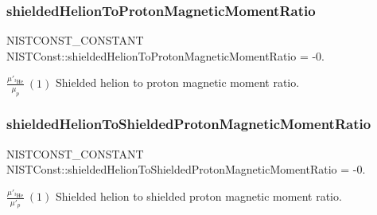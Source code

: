 \subsubsection{\texorpdfstring{shielded\+Helion\+To\+Proton\+Magnetic\+Moment\+Ratio}{shieldedHelionToProtonMagneticMomentRatio}}
{\footnotesize\ttfamily N\+I\+S\+T\+C\+O\+N\+S\+T\+\_\+\+C\+O\+N\+S\+T\+A\+NT N\+I\+S\+T\+Const\+::shielded\+Helion\+To\+Proton\+Magnetic\+Moment\+Ratio = -\/0.}

$\frac{\mu'_{^3\textrm{He}}}{\mu_p} \ (1)$ Shielded helion to proton magnetic moment ratio. \mbox{\label{group___n_i_s_t_const-_helion_gab3aafda5bad54b0ce79e85f2c142ebb2}} 
\subsubsection{\texorpdfstring{shielded\+Helion\+To\+Shielded\+Proton\+Magnetic\+Moment\+Ratio}{shieldedHelionToShieldedProtonMagneticMomentRatio}}
{\footnotesize\ttfamily N\+I\+S\+T\+C\+O\+N\+S\+T\+\_\+\+C\+O\+N\+S\+T\+A\+NT N\+I\+S\+T\+Const\+::shielded\+Helion\+To\+Shielded\+Proton\+Magnetic\+Moment\+Ratio = -\/0.}

$\frac{\mu'_{^3\textrm{He}}}{\mu'_p} \ (1)$ Shielded helion to shielded proton magnetic moment ratio. 